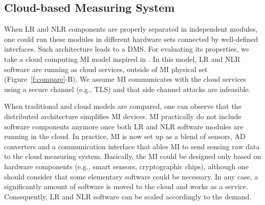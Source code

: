 \documentclass[conference]{IEEEtran}
\begin{document}
\subsection{Cloud-based Measuring System}
\label{s:mi_cloud}
When LR and NLR components are properly separated in independent modules, one could run these modules in different hardware sets connected by well-defined interfaces. Such architecture leads to a DMS. For evaluating its properties, we take a cloud computing MI model inspired in \cite{Oppermann2016}. In this model, LR and NLR software are running as cloud services, outside of MI physical set (Figure~\ref{f:compare}-B). We assume MI communicates with the cloud services using a secure channel (e.g., TLS) and that side channel attacks are infeasible.

When traditional and cloud models are compared, one can observe that the distributed architecture simplifies MI devices. MI practically do not include software components anymore once both LR and NLR software modules are running in the cloud. In practice, MI is now set up as a blend of sensors, AD converters and a communication interface that ables MI to send sensing raw data to the cloud measuring system. Basically, the MI could be designed only based on hardware components (e.g., smart sensors, cryptographic chips), although one should consider that some elementary software could be necessary. In any case, a significantly amount of software is moved to the cloud and works as a service. Consequently, LR and NLR software can be scaled accordingly to the demand.

\end{document}

